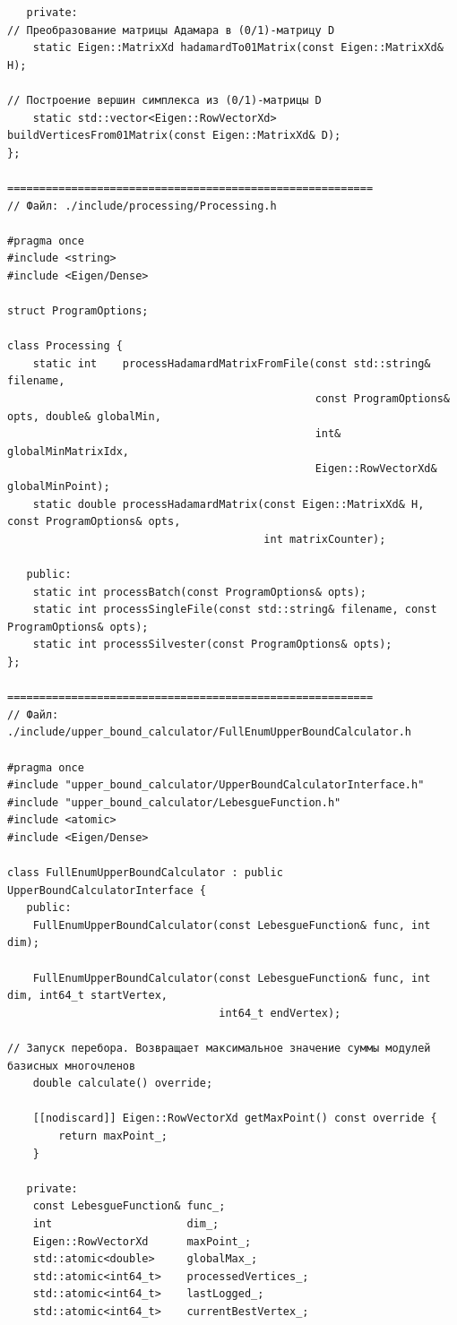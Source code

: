 \documentclass[a4paper,12pt]{article}
\theoremstyle{indented}
\begin{document}
\begin{lstlisting}
   private:
// Преобразование матрицы Адамара в (0/1)-матрицу D
    static Eigen::MatrixXd hadamardTo01Matrix(const Eigen::MatrixXd& H);

// Построение вершин симплекса из (0/1)-матрицы D
    static std::vector<Eigen::RowVectorXd> buildVerticesFrom01Matrix(const Eigen::MatrixXd& D);
};

=========================================================
// Файл: ./include/processing/Processing.h

#pragma once
#include <string>
#include <Eigen/Dense>

struct ProgramOptions;

class Processing {
    static int    processHadamardMatrixFromFile(const std::string&    filename,
                                                const ProgramOptions& opts, double& globalMin,
                                                int&                globalMinMatrixIdx,
                                                Eigen::RowVectorXd& globalMinPoint);
    static double processHadamardMatrix(const Eigen::MatrixXd& H, const ProgramOptions& opts,
                                        int matrixCounter);

   public:
    static int processBatch(const ProgramOptions& opts);
    static int processSingleFile(const std::string& filename, const ProgramOptions& opts);
    static int processSilvester(const ProgramOptions& opts);
};

=========================================================
// Файл: ./include/upper_bound_calculator/FullEnumUpperBoundCalculator.h

#pragma once
#include "upper_bound_calculator/UpperBoundCalculatorInterface.h"
#include "upper_bound_calculator/LebesgueFunction.h"
#include <atomic>
#include <Eigen/Dense>

class FullEnumUpperBoundCalculator : public UpperBoundCalculatorInterface {
   public:
    FullEnumUpperBoundCalculator(const LebesgueFunction& func, int dim);

    FullEnumUpperBoundCalculator(const LebesgueFunction& func, int dim, int64_t startVertex,
                                 int64_t endVertex);

// Запуск перебора. Возвращает максимальное значение суммы модулей базисных многочленов
    double calculate() override;

    [[nodiscard]] Eigen::RowVectorXd getMaxPoint() const override {
        return maxPoint_;
    }

   private:
    const LebesgueFunction& func_;
    int                     dim_;
    Eigen::RowVectorXd      maxPoint_;
    std::atomic<double>     globalMax_;
    std::atomic<int64_t>    processedVertices_;
    std::atomic<int64_t>    lastLogged_;
    std::atomic<int64_t>    currentBestVertex_;


\end{lstlisting}
\end{document}
